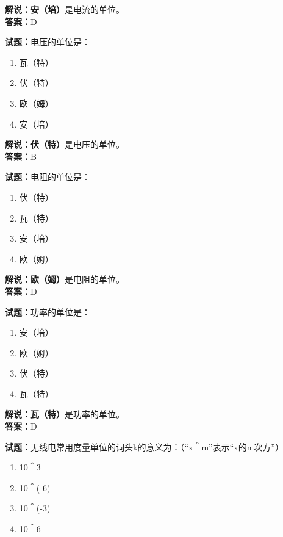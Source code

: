 \documentclass{ctexbook}
\begin{document}
\noindent\textbf{解说：}\textbf{安（培）}是电流的单位。\\\noindent\textbf{答案：}D


\bigskip


\noindent\textbf{试题：}电压的单位是：

\begin{enumerate}[leftmargin=3em]
	\item 瓦（特）
	\item 伏（特）
	\item 欧（姆）
	\item 安（培）
\end{enumerate}

\noindent\textbf{解说：伏（特）}是电压的单位。\\\noindent\textbf{答案：}B


\bigskip


\noindent\textbf{试题：}电阻的单位是：

\begin{enumerate}[leftmargin=3em]
	\item 伏（特）
	\item 瓦（特）
	\item 安（培）
	\item 欧（姆）
\end{enumerate}

\noindent\textbf{解说：欧（姆）}是电阻的单位。\\\noindent\textbf{答案：}D


\bigskip


\noindent\textbf{试题：}功率的单位是：

\begin{enumerate}[leftmargin=3em]
	\item 安（培）
	\item 欧（姆）
	\item 伏（特）
	\item 瓦（特）
\end{enumerate}

\noindent\textbf{解说：瓦（特）}是功率的单位。\\\noindent\textbf{答案：}D


\bigskip


\noindent\textbf{试题：}无线电常用度量单位的词头k的意义为：（“x＾m”表示“x的m次方”）

\begin{enumerate}[leftmargin=3em]
	\item 10＾3
	\item 10＾(-6)
	\item 10＾(-3)
	\item 10＾6
\end{enumerate}
\end{document}
